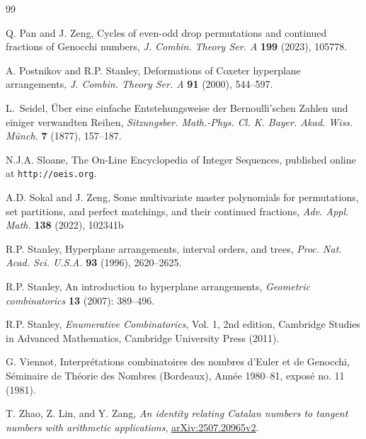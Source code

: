 \documentclass[11pt,reqno]{amsart}
\numberwithin{equation}{section}
\theoremstyle{plain}
\theoremstyle{definition}
\begin{document}
\begin{thebibliography}{99}
    

    

     Q. Pan and J. Zeng, Cycles of even-odd drop permutations and continued fractions of Genocchi numbers, {\em J. Combin. Theory Ser. A} {\bf199} (2023), 105778.
    
    

     A. Postnikov and R.P. Stanley, Deformations of Coxeter hyperplane arrangements, {\em J. Combin. Theory Ser. A} {\bf91} (2000), 544--597.

     L.~Seidel, \"Uber eine einfache Entstehungsweise der Bernoulli'schen Zahlen und einiger verwandten Reihen, {\em Sitzungsber. Math.-Phys. Cl. K. Bayer. Akad. Wiss. M\"unch.} {\bf7} (1877), 157--187.

    

     N.J.A. Sloane, The On-Line Encyclopedia of Integer Sequences, published online at {\tt http://oeis.org}.
    
     A.D. Sokal and J. Zeng, Some multivariate master polynomials for permutations, set partitions, and perfect matchings, and their continued fractions, {\em Adv. Appl. Math.} {\bf138} (2022), 102341b

     R.P. Stanley, Hyperplane arrangements, interval orders, and trees, {\em Proc. Nat. Acad. Sci. U.S.A.} {\bf93} (1996), 2620--2625.

     R.P. Stanley, An introduction to hyperplane arrangements, {\em Geometric combinatorics} {\bf13} (2007): 389--496.

     R.P. Stanley, {\it Enumerative Combinatorics}, Vol. 1, 2nd edition, Cambridge Studies in Advanced Mathematics, Cambridge University Press (2011). 
    
     G. Viennot, Interpr\'etations combinatoires des nombres d'Euler et de Genocchi, S\'eminaire de Th\'eorie des Nombres (Bordeaux), Ann\'ee 1980--81, expos\'e no. 11 (1981).

     T. Zhao, Z. Lin, and Y. Zang, {\it An identity relating Catalan numbers to tangent numbers with arithmetic applications}, \href{https://arxiv.org/abs/2507.20965v2}{arXiv:2507.20965v2}.
    
\end{thebibliography}
\end{document}
